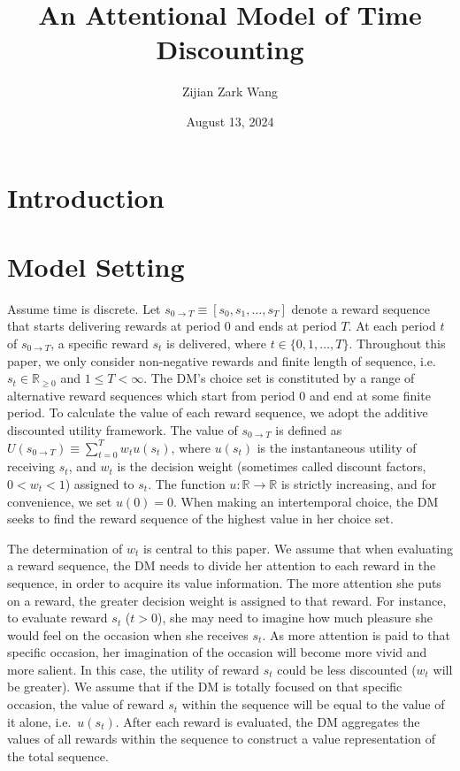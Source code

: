 \documentclass[
  12pt,
]{article}
\title{An Attentional Model of Time Discounting}
\author{Zijian Zark Wang}
\date{August 13, 2024}
\begin{document}
\maketitle

\hypertarget{introduction}{%
\section{Introduction}\label{introduction}}

\hypertarget{model-setting}{%
\section{\texorpdfstring{Model Setting
\label{model_setting}}{Model Setting }}\label{model-setting}}

Assume time is discrete. Let
\(s_{0\rightarrow T}\equiv[s_0,s_1,...,s_T]\) denote a reward sequence
that starts delivering rewards at period 0 and ends at period \(T\). At
each period \(t\) of \(s_{0\rightarrow T}\), a specific reward \(s_t\)
is delivered, where \(t\in\{0,1,…,T\}\). Throughout this paper, we only
consider non-negative rewards and finite length of sequence,
i.e.~\(s_t \in \mathbb{R}_{\geq 0}\) and \(1\leq T<\infty\). The DM's
choice set is constituted by a range of alternative reward sequences
which start from period 0 and end at some finite period. To calculate
the value of each reward sequence, we adopt the additive discounted
utility framework. The value of \(s_{0\rightarrow T}\) is defined as
\(U(s_{0\rightarrow T})\equiv \sum_{t=0}^T w_{t}u(s_t)\), where
\(u(s_t)\) is the instantaneous utility of receiving \(s_t\), and
\(w_t\) is the decision weight (sometimes called discount factors,
\(0<w_t<1\)) assigned to \(s_t\). The function
\(u:\mathbb{R}\rightarrow \mathbb{R}\) is strictly increasing, and for
convenience, we set \(u(0)=0\). When making an intertemporal choice, the
DM seeks to find the reward sequence of the highest value in her choice
set.

The determination of \(w_t\) is central to this paper. We assume that
when evaluating a reward sequence, the DM needs to divide her attention
to each reward in the sequence, in order to acquire its value
information. The more attention she puts on a reward, the greater
decision weight is assigned to that reward. For instance, to evaluate
reward \(s_t\) (\(t>0\)), she may need to imagine how much pleasure she
would feel on the occasion when she receives \(s_t\). As more attention
is paid to that specific occasion, her imagination of the occasion will
become more vivid and more salient. In this case, the utility of reward
\(s_t\) could be less discounted (\(w_t\) will be greater). We assume
that if the DM is totally focused on that specific occasion, the value
of reward \(s_t\) within the sequence will be equal to the value of it
alone, i.e.~\(u(s_t)\). After each reward is evaluated, the DM
aggregates the values of all rewards within the sequence to construct a
value representation of the total sequence.
\end{document}
